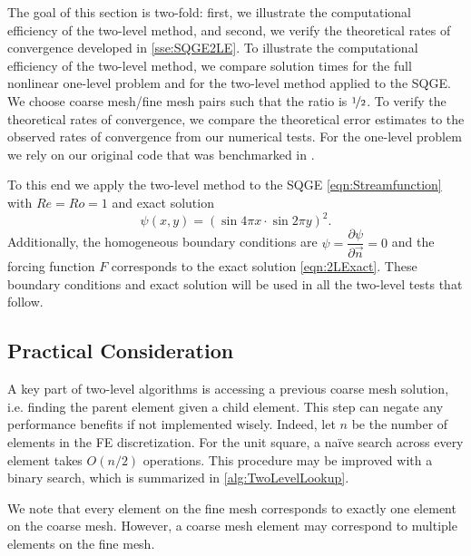 The goal of this section is two-fold: first, we illustrate the computational
efficiency of the two-level method, and second, we verify the theoretical rates
of convergence developed in \autoref{sse:SQGE2LE}.  To illustrate the
computational efficiency of the two-level method, we compare solution times for
the full nonlinear one-level problem and for the two-level method applied to the
SQGE. We choose coarse mesh/fine mesh pairs such that the ratio is
$\nicefrac{1}{2}$. To verify the theoretical rates of convergence, we compare
the theoretical error estimates to the observed rates of convergence from our
numerical tests. For the one-level problem we rely on our original code that was
benchmarked in \cite{Foster}.

To this end we apply the two-level method to the SQGE \eqref{eqn:Streamfunction}
with $Re=Ro=1$ and exact solution
\begin{equation}
  \psi(x,y) = \left(\sin 4\pi x \cdot \sin 2\pi y\right)^2.
  \label{eqn:2LExact}
\end{equation}
Additionally, the homogeneous boundary conditions are $\psi=\dfrac{\partial
\psi}{\partial \vec{n}}=0$ and the forcing function $F$ corresponds to the exact
solution \eqref{eqn:2LExact}. These boundary conditions and exact solution will
be used in all the two-level tests that follow.

\subsection{Practical Consideration}
A key part of two-level algorithms is accessing a previous coarse mesh solution,
i.e. finding the parent element given a child element. This step can negate any
performance benefits if not implemented wisely. Indeed, let $ n $ be the number
of elements in the FE discretization. For the unit square, a na\"{i}ve search
across every element takes $ O(n/2) $ operations. This procedure may be improved
with a binary search, which is summarized in \autoref{alg:TwoLevelLookup}.

We note that every element on the fine mesh corresponds to exactly one element
on the coarse mesh. However, a coarse mesh element may correspond to multiple
elements on the fine mesh.

